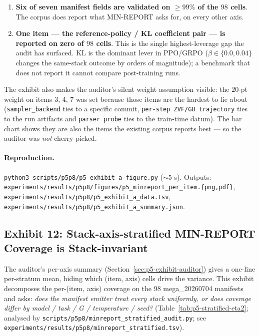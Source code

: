 \documentclass{article}  \usepackage[preprint,nonatbib]{neurips_2026} \usepackage[numbers]{natbib}
\providecommand{\tableref}[1]{Table~\ref{#1}}
\providecommand{\secref}[1]{Section~\ref{#1}}
\begin{document}
\begin{enumerate}
\item \textbf{Six of seven manifest fields are validated on $\ge 99\%$ of the
$98$ cells}. The corpus does report what MIN-REPORT asks for, on
every other axis.
\item \textbf{One item — the reference-policy / KL coefficient pair —
is reported on zero of $98$ cells}. This is the single highest-leverage
gap the audit has surfaced. KL is the dominant lever in PPO/GRPO
($\beta \in \{0.0, 0.04\}$ changes the same-stack outcome by orders of
magnitude); a benchmark that does not report it cannot compare
post-training runs.
\end{enumerate}

The exhibit also makes the auditor's silent weight assumption visible:
the $20$-pt weight on items 3, 4, 7 was set because those items are the
hardest to lie about (\texttt{sampler\_backend} ties to a specific
commit, \texttt{per-step ZVF/GU trajectory} ties to the run artifacts
and \texttt{parser probe} ties to the train-time datum). The bar chart
shows they are also the items the existing corpus reports best ---
so the auditor was \emph{not} cherry-picked.

\paragraph{Reproduction.} \texttt{python3 scripts/p5p8/p5\_exhibit\_a\_figure.py}
($\sim$5 s). Outputs:
\texttt{experiments/results/p5p8/figures/p5\_minreport\_per\_item.\{png,pdf\}},
\texttt{experiments/results/p5p8/p5\_exhibit\_a\_data.tsv},
\texttt{experiments/results/p5p8/p5\_exhibit\_a\_summary.json}.

\subsection{Exhibit 12: Stack-axis-stratified MIN-REPORT Coverage is Stack-invariant}
\label{sec:p5-exhibit-stratified}
The auditor's per-axis summary (\secref{sec:p5-exhibit-auditor}) gives a
one-line per-stratum mean, hiding which (item, axis) cells drive the
variance. This exhibit decomposes the per-(item, axis) coverage on the
98 mega_20260704 manifests and asks: \emph{does the manifest emitter
treat every stack uniformly, or does coverage differ by model / task /
G / temperature / seed?}
(\tableref{tab:p5-stratified-eta2}; analysed by
\texttt{scripts/p5p8/minreport\_stratified\_audit.py}; see
\texttt{experiments/results/p5p8/minreport\_stratified.tsv}).
\end{document}
